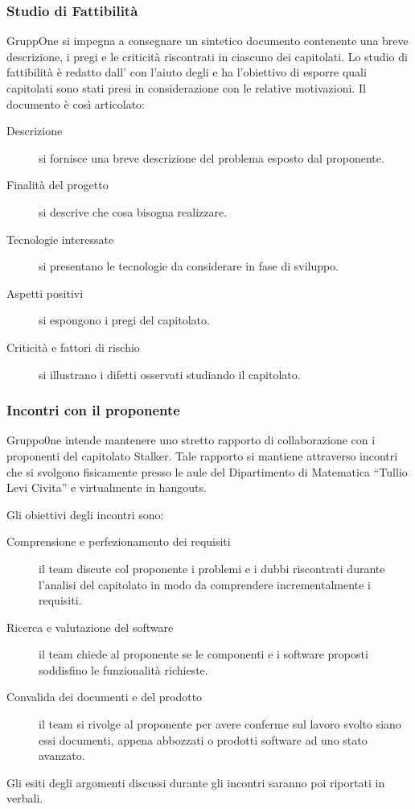 \documentclass[../norme-di-progetto.tex]{subfiles}
\begin{document}
\subsubsection{Studio di Fattibilità}%
\label{subs:studio_di_fattibilita}
GruppOne si impegna a consegnare un sintetico documento contenente una breve descrizione, i pregi e le criticità riscontrati in ciascuno dei capitolati. Lo studio di fattibilità è redatto dall'
con l'aiuto degli  e ha l'obiettivo di esporre quali capitolati sono stati presi in considerazione con le relative motivazioni. Il documento è così articolato:
\begin{description}
  \item [Descrizione] si fornisce una breve descrizione del problema esposto dal proponente.
  \item [Finalità del progetto] si descrive che cosa bisogna realizzare.
  \item [Tecnologie interessate] si presentano le tecnologie da considerare in fase di sviluppo.
  \item [Aspetti positivi] si espongono i pregi del capitolato.
  \item [Criticità e fattori di rischio] si illustrano i difetti osservati studiando il capitolato.
\end{description}

\subsubsection{Incontri con il proponente}%
\label{subs:incontri_con_il_proponente}

Gruppo0ne intende mantenere uno stretto rapporto di collaborazione con i proponenti del capitolato Stalker. Tale rapporto si mantiene attraverso incontri che si svolgono fisicamente presso le aule del Dipartimento di Matematica ``Tullio Levi Civita'' e virtualmente in hangouts.

Gli obiettivi degli incontri sono:
\begin{description}
  \item [Comprensione e perfezionamento dei requisiti] il team discute col proponente i problemi e i dubbi riscontrati durante l'analisi del capitolato in modo da comprendere incrementalmente i requisiti.
  \item [Ricerca e valutazione del software] il team chiede al proponente se le componenti e i software proposti soddisfino le funzionalità richieste.
  \item [Convalida dei documenti e del prodotto] il team si rivolge al proponente per avere conferme sul lavoro svolto siano essi documenti,  appena abbozzati o prodotti software ad uno stato avanzato.
\end{description}
Gli esiti degli argomenti discussi durante gli incontri saranno poi riportati in verbali.
\end{document}
